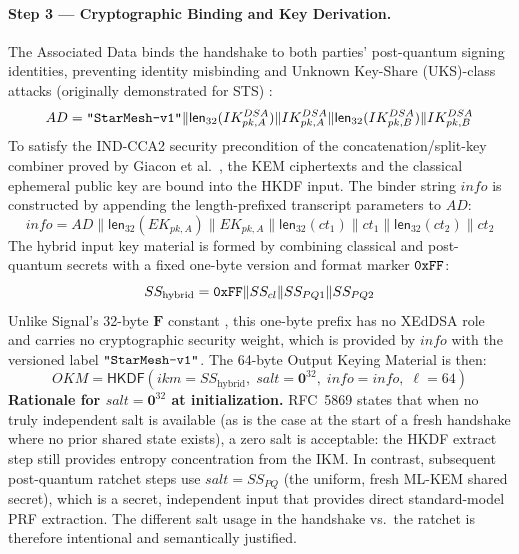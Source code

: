 \documentclass[11pt,a4paper]{article}
\theoremstyle{remark}
\theoremstyle{plain}
\newcommand{\HKDF}{\mathsf{HKDF}}
\newcommand{\flen}[1]{\mathsf{len}_{32}(#1)}
\newcommand{\strlit}[1]{\text{\upshape\texttt{"#1"}}}
\newcommand{\hexlit}[1]{\text{\upshape\texttt{#1}}}
\begin{document}
\paragraph{Step 3 --- Cryptographic Binding and Key Derivation.}
The Associated Data binds the handshake to both parties' post-quantum signing identities,
preventing identity misbinding and Unknown Key-Share (UKS)-class attacks (originally
demonstrated for STS) \cite{blake1997unknown}:
\[
  AD = \strlit{StarMesh-v1} \| \flen{IK^{DSA}_{pk,A}} \| IK^{DSA}_{pk,A}
                            \| \flen{IK^{DSA}_{pk,B}} \| IK^{DSA}_{pk,B}
\]
To satisfy the IND-CCA2 security precondition of the concatenation/split-key combiner proved by Giacon et al.~\cite{giacon2018kem}, the KEM ciphertexts and the classical ephemeral public key are bound into the HKDF input. The binder string $info$ is constructed by appending the length-prefixed transcript parameters to $AD$:
\[
  info = AD \| \flen{EK_{pk,A}} \| EK_{pk,A} \| \flen{ct_1} \| ct_1 \| \flen{ct_2} \| ct_2
\]
The hybrid input key material is formed by combining classical and post-quantum secrets with a
fixed one-byte version and format marker $\hexlit{0xFF}$:
\[
  SS_{\text{hybrid}} = \hexlit{0xFF} \| SS_{cl} \| SS_{PQ1} \| SS_{PQ2}
\]
Unlike Signal's 32-byte $\mathbf{F}$ constant \cite{signal_pqxdh}, this one-byte prefix has no XEdDSA role and carries no cryptographic security weight, which is provided by $info$ with the versioned label $\strlit{StarMesh-v1}$.
The 64-byte Output Keying Material is then:
\[
  OKM = \HKDF\!\left(ikm = SS_{\text{hybrid}},\; salt = \mathbf{0}^{32},\;
                     info = info,\; \ell = 64\right)
\]
\textbf{Rationale for $salt = \mathbf{0}^{32}$ at initialization.}  RFC~5869
\cite{rfc5869} states that when no truly independent salt is available (as is the case at the
start of a fresh handshake where no prior shared state exists), a zero salt is acceptable: the
HKDF extract step still provides entropy concentration from the IKM.  In contrast, subsequent
post-quantum ratchet steps use $salt = SS_{PQ}$ (the uniform, fresh ML-KEM shared secret), which is a secret, independent input that
provides direct standard-model PRF extraction.  The different salt usage in the handshake vs.\ the
ratchet is therefore intentional and semantically justified.
\end{document}

